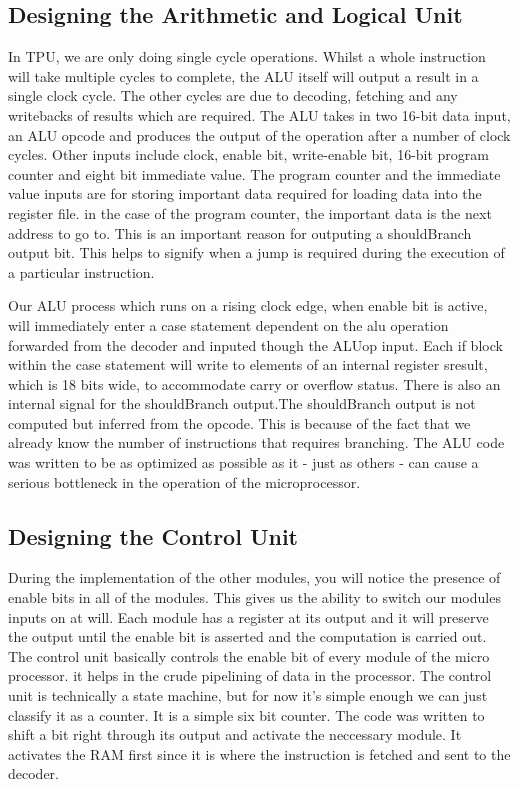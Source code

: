 \subsection{Designing the Arithmetic and Logical Unit}

In TPU, we are only doing single cycle operations. Whilst a whole instruction will take multiple cycles to complete, the ALU itself will output a result in a single clock cycle. The other cycles are due to decoding, fetching and any writebacks of results which are required. The ALU takes in two 16-bit data input, an ALU opcode and produces the output of the operation after a number of clock cycles. 
Other inputs include clock, enable bit, write-enable bit, 16-bit program counter and eight bit immediate value. The program counter and the immediate value inputs are for storing important data required for loading data into the register file. in the case of the program counter, the important data is the next address to go to. This is an important reason for outputing a shouldBranch output bit. This helps to signify when a jump is required during the execution of a particular instruction.

Our ALU process which runs on a rising clock edge, when enable bit is active, will immediately enter a case statement dependent on the alu operation forwarded from the decoder and inputed though the ALUop input. 
Each if block within the case statement will write to elements of an internal register sresult, which is 18 bits wide, to accommodate carry or overflow status. There is also an internal signal for the shouldBranch output.The shouldBranch output is not computed but inferred from the opcode. This is because of the fact that we already know the number of instructions that requires branching. 
The ALU code was written to be as optimized as possible as it - just as others - can cause a serious bottleneck in the operation of the microprocessor.





\subsection{Designing the Control Unit}
During the implementation of the other modules, you will notice the presence of enable bits in all of the modules. This gives us the ability to switch our modules inputs on at will. Each module has a register at its output and it will preserve the output until the enable bit is asserted and the computation is carried out.  
The control unit basically controls the enable bit of every module of the micro processor. it helps in the crude pipelining of data in the processor. 
The control unit is technically a state machine, but for now it’s simple enough we can just classify it as a counter. It is a simple six bit counter. The code was written to shift a bit right through its output and activate the neccessary module. It activates the RAM first since it is where the instruction is fetched and sent to the decoder.







